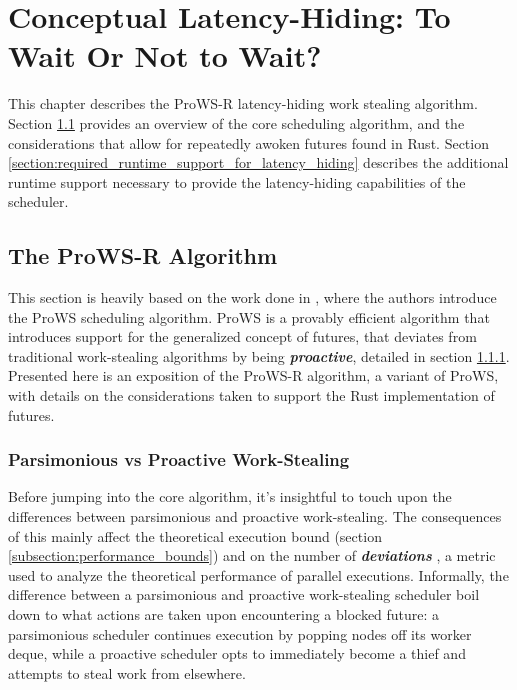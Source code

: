 \documentclass[bsc,frontabs,singlespacing,parskip,deptreport,normalheadings]{infthesis}
\begin{document}

\chapter{Conceptual Latency-Hiding: To Wait Or Not to Wait?}
\label{chapter:conceptual_latency-hiding:_to_wait_or_not_to_wait?}

This chapter describes the ProWS-R latency-hiding work stealing algorithm.
Section \ref{section:overview_of_the_prows_algorithm} provides an overview of
the core scheduling algorithm, and the considerations that allow for repeatedly
awoken futures found in Rust. Section
\ref{section:required_runtime_support_for_latency_hiding} describes the
additional runtime support necessary to provide the latency-hiding capabilities
of the scheduler.

\section{The ProWS-R Algorithm}
\label{section:overview_of_the_prows_algorithm}

This section is heavily based on the work done in \cite{singer_proactive_2019},
where the authors introduce the ProWS scheduling algorithm. ProWS is a provably
efficient algorithm that introduces support for the generalized concept of
futures, that deviates from traditional work-stealing algorithms by being
\textit{\textbf{proactive}}, detailed in section 
\ref{subsection:parsimonious_vs_proactive_work-stealing}. Presented here is an
exposition of the ProWS-R algorithm, a variant of ProWS, with details on the
considerations taken to support the Rust implementation of futures.

\subsection{Parsimonious vs Proactive Work-Stealing}
\label{subsection:parsimonious_vs_proactive_work-stealing}

Before jumping into the core algorithm, it's insightful to touch upon the
differences between parsimonious and proactive work-stealing. The consequences
of this mainly affect the theoretical execution bound (section
\ref{subsection:performance_bounds}) and on the number of
\textit{\textbf{deviations}} \cite{spoonhower_beyond_2009}, a metric used to
analyze the theoretical performance of parallel executions. Informally, the
difference between a parsimonious and proactive work-stealing scheduler boil
down to what actions are taken upon encountering a blocked future: a
parsimonious scheduler continues execution by popping nodes off its worker
deque, while a proactive scheduler opts to immediately become a thief and
attempts to steal work from elsewhere. 
\end{document}
